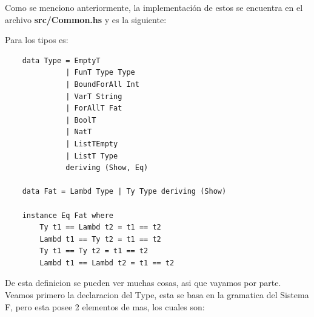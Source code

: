 \documentclass[12pt, titlepage, a4paper]{article}
\begin{document}
Como se menciono anteriormente, la implementación de estos se encuentra en el archivo \textbf{src/Common.hs} y es la siguiente:

\noindent Para los tipos es:
\begin{verbatim}
    data Type = EmptyT 
              | FunT Type Type
              | BoundForAll Int
              | VarT String
              | ForAllT Fat
              | BoolT
              | NatT
              | ListTEmpty
              | ListT Type
              deriving (Show, Eq)
    
    data Fat = Lambd Type | Ty Type deriving (Show)
    
    instance Eq Fat where
        Ty t1 == Lambd t2 = t1 == t2
        Lambd t1 == Ty t2 = t1 == t2
        Ty t1 == Ty t2 = t1 == t2
        Lambd t1 == Lambd t2 = t1 == t2
\end{verbatim}

De esta definicion se pueden ver muchas cosas, asi que vayamos por parte. Veamos primero la declaracion del Type, esta se basa en la gramatica del Sistema F, pero 
esta posee 2 elementos de mas, los cuales son: 

\end{document}
